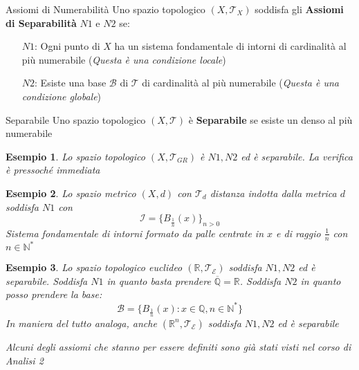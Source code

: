 \documentclass[11pt,a4paper,twoside]{article}
\newtheorem{es}{Esempio}
\theoremstyle{definition}
\begin{document}
\begin{defn}{Assiomi di Numerabilità}{}
	Uno spazio topologico $(X, \mathcal T_X)$ soddisfa gli \textbf{Assiomi di Separabilità} $N1$ e $N2$ se:
	\begin{itemize}
		\item[$N1$:] Ogni punto di $X$ ha un sistema fondamentale di intorni di cardinalità al più numerabile (\textit{Questa è una condizione locale})
		\item[$N2$:] Esiste una base $\mathcal B$ di $\mathcal T$ di cardinalità al più numerabile (\textit{Questa è una condizione globale})
	\end{itemize}
\end{defn}

\begin{defn}{Separabile}{}
	Uno spazio topologico $(X, \mathcal T)$ è \textbf{Separabile} se esiste un denso al più numerabile
\end{defn}

\begin{es}
	Lo spazio topologico $(X, \mathcal T_{GR})$ è $N1, N2$ ed è separabile. La verifica è pressoché immediata
\end{es}

\begin{es}
	Lo spazio metrico $(X, d)$ con $\mathcal T_d$ distanza indotta dalla metrica $d$ soddisfa $N1$ con
	\[\mathcal I = \{B_{\frac 1n}(x)\}_{n>0} \]
	Sistema fondamentale di intorni formato da palle centrate in $x$ e di raggio $\frac 1n$ con $n \in \mathbb N^*$
\end{es}

\begin{es}
	Lo spazio topologico euclideo $(\mathbb R, \mathcal T_\mathcal E)$ soddisfa $N1, N2$ ed è separabile. Soddisfa $N1$ in quanto basta prendere $\overline {\mathbb Q} = \mathbb R$. Soddisfa $N2$ in quanto posso prendere la base:
	\[ \mathcal B = \{B_{\frac 1n}(x) : x \in \mathbb Q, n \in \mathbb N^*\} \]
	In maniera del tutto analoga, anche $(\mathbb R^n, \mathcal T_\mathcal E)$ soddisfa $N1, N2$ ed è separabile
\end{es}

\textit{Alcuni degli assiomi che stanno per essere definiti sono già stati visti nel corso di Analisi 2}
\end{document}
